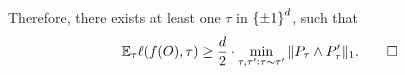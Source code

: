 \documentclass{article}
\newtheorem{definition}{Definition}
\newcommand{\EE}{\mathbb{E}}
\newcommand{\Ocal}{\mathcal{O}}
\newcommand{\defeq}{\triangleq}
\begin{document}
Therefore, there exists at least one $\tau$ in $\cbr{\pm 1}^d$, such that
\[ \EE_{\tau} \ell(f(O), \tau) \geq \frac{d}{2} \cdot \min_{\tau, \tau': \tau \sim \tau'} \| P_\tau \wedge P_\tau' \|_1. \qed \]




\end{document}
